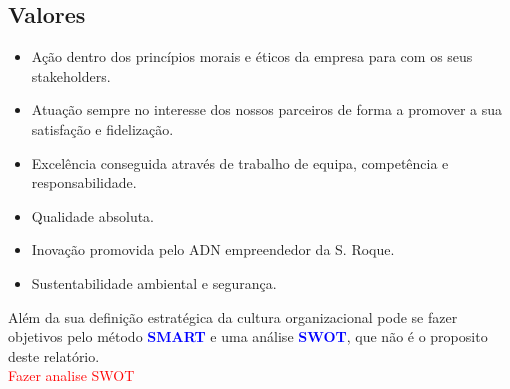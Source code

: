 \subsection{Valores}
\begin{itemize}
\setlength\itemsep{-0.3em}
\item Ação dentro dos princípios morais e éticos da empresa para com os seus stakeholders.
\item Atuação sempre no interesse dos nossos parceiros de forma a promover a sua satisfação e fidelização.
\item Excelência conseguida através de trabalho de equipa, competência e responsabilidade.
\item Qualidade absoluta.
\item Inovação promovida pelo ADN empreendedor da S. Roque.
\item Sustentabilidade ambiental e segurança.
\end{itemize}\par
Além da sua definição estratégica da cultura organizacional pode se fazer objetivos pelo método \textcolor{blue}{\textbf{SMART}} e uma análise \textcolor{blue}{\textbf{SWOT}}, que não é o proposito deste relatório.\\
\textcolor{red}{Fazer analise SWOT}\\
